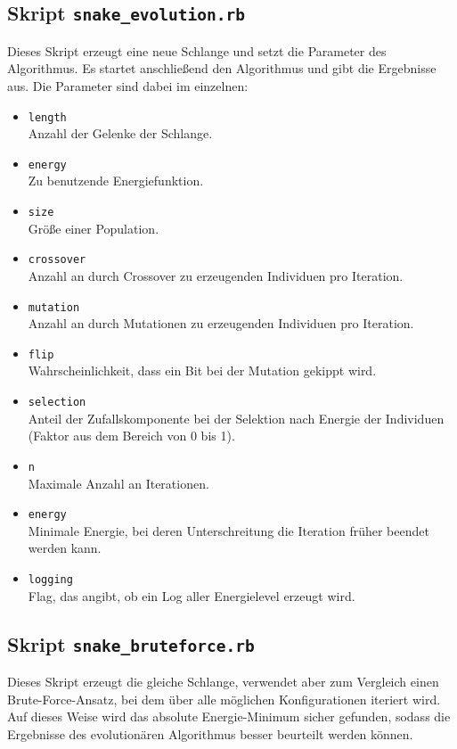 \documentclass[parskip=half,paper=a4]{scrartcl}
\begin{document}
  \subsection[Skript Evolution]{Skript \lstinline-snake_evolution.rb-}
    Dieses Skript erzeugt eine neue Schlange und setzt die Parameter des
    Algorithmus. Es startet anschließend den Algorithmus und gibt die Ergebnisse
    aus. Die Parameter sind dabei im einzelnen:
    \begin{itemize}
      \item \lstinline-length-\\
        Anzahl der Gelenke der Schlange.
      \item \lstinline-energy-\\
        Zu benutzende Energiefunktion.
      \item \lstinline-size-\\
        Größe einer Population.
      \item \lstinline-crossover-\\
        Anzahl an durch Crossover zu erzeugenden
        Individuen pro Iteration.
      \item \lstinline-mutation-\\
        Anzahl an durch Mutationen zu erzeugenden
        Individuen pro Iteration.
      \item \lstinline-flip-\\
        Wahrscheinlichkeit, dass ein Bit bei der Mutation
        gekippt wird.
      \item \lstinline-selection-\\
        Anteil der Zufallskomponente bei der
        Selektion nach Energie der Individuen (Faktor aus dem
        Bereich von 0 bis 1).
      \item \lstinline-n-\\
        Maximale Anzahl an Iterationen.
      \item \lstinline-energy-\\
        Minimale Energie, bei deren Unterschreitung
        die Iteration früher beendet werden kann.
      \item \lstinline-logging-\\
        Flag, das angibt, ob ein Log aller
        Energielevel erzeugt wird.
    \end{itemize}
  
  \subsection[Skript Brute-Force]{Skript \lstinline-snake_bruteforce.rb-}
    Dieses Skript erzeugt die gleiche Schlange, verwendet aber zum Vergleich
    einen Brute-Force-Ansatz, bei dem über alle möglichen Konfigurationen iteriert
    wird. Auf dieses Weise wird das absolute Energie-Minimum sicher gefunden, sodass
    die Ergebnisse des evolutionären Algorithmus besser beurteilt werden können.
  
\end{document}

